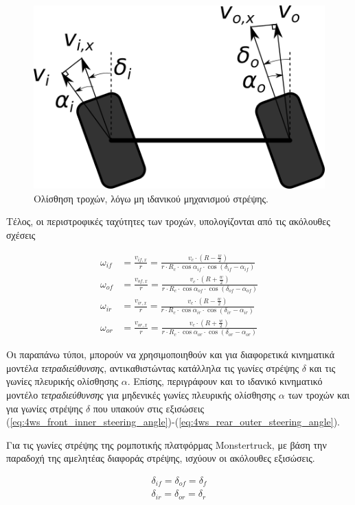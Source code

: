 \begin{figure}[!ht]
   \centering
	\includegraphics[width=0.4\linewidth]{Chapters/Chapter2/Figures/slip_angles.png}
	\caption{Ολίσθηση τροχών, λόγω μη ιδανικού μηχανισμού στρέψης.}
	\label{fig:slip_angles}
\end{figure}


\bigskip
Τέλος, οι περιστροφικές ταχύτητες των τροχών, υπολογίζονται από τις ακόλουθες σχέσεις

\begin{align}
	\label{eq:monst_wif}	
	\omega_{if} &= \frac{v_{if,x}}{r} = \frac{v_c \cdot (R - \frac{w}{2})}{r \cdot R_c \cdot \cos\alpha_{if} \cdot \cos(\delta_{if} - \alpha_{if})}\\
	\label{eq:monst_wof}
	\omega_{of} &= \frac{v_{of,x}}{r} = \frac{v_c \cdot (R + \frac{w}{2})}{r \cdot R_c \cdot \cos\alpha_{of} \cdot \cos(\delta_{of} - \alpha_{of})}\\
	\label{eq:monst_wir}	
	\omega_{ir} &= \frac{v_{ir,x}}{r} = \frac{v_c \cdot (R - \frac{w}{2})}{r \cdot R_c \cdot \cos\alpha_{ir} \cdot \cos(\delta_{ir} - \alpha_{ir})}\\
	\label{eq:monst_wor}
	\omega_{or} &= \frac{v_{or,x}}{r} = \frac{v_c \cdot (R + \frac{w}{2})}{r \cdot R_c \cdot \cos\alpha_{or} \cdot \cos(\delta_{or} - \alpha_{or})}
\end{align}

\bigskip
Οι παραπάνω τύποι, μπορούν να χρησιμοποιηθούν και για διαφορετικά κινηματικά μοντέλα \textit{τετραδιεύθυνσης}, αντικαθιστώντας κατάλληλα τις γωνίες στρέψης $\delta$ και τις γωνίες πλευρικής ολίσθησης $\alpha$. Επίσης, περιγράφουν και το ιδανικό κινηματικό μοντέλο \textit{τετραδιεύθυνσης} για μηδενικές γωνίες πλευρικής ολίσθησης $\alpha$ των τροχών και για γωνίες στρέψης $\delta$ που υπακούν στις εξισώσεις  (\ref{eq:4ws_front_inner_steering_angle})-(\ref{eq:4ws_rear_outer_steering_angle}).

\bigskip
Για τις γωνίες στρέψης της ρομποτικής πλατφόρμας Monstertruck, με βάση την παραδοχή της αμελητέας διαφοράς στρέψης, ισχύουν οι ακόλουθες εξισώσεις.

\begin{align}
	\delta_{if} = \delta_{of} = \delta_{f}
	\label{eq:monst_front_angles}\\
	\delta_{ir} = \delta_{or} = \delta_{r}
	\label{eq:monst_rear_angles}
\end{align}

